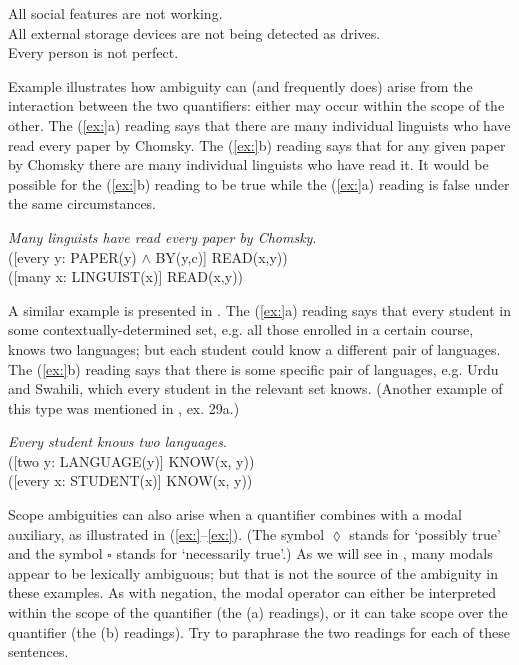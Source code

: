 \ea
\ea All social features are not working.\\
\ex All external storage devices are not being detected as drives.\\
\ex Every person is not perfect.
                       \z
\z


Example  illustrates how ambiguity can (and frequently does) arise from the interaction between the two quantifiers: either may occur within the scope of the other. The (\ref{ex:}a) reading says that there are many individual linguists who have read every paper by Chomsky. The (\ref{ex:}b) reading says that for any given paper by Chomsky there are many individual linguists who have read it. It would be possible for the (\ref{ex:}b) reading to be true while the (\ref{ex:}a) reading is false under the same circumstances.


\ea
\textit{Many linguists have read every paper by Chomsky}.\\
 ([every y: PAPER(y) $\wedge$ BY(y,c)] READ(x,y))\\
 ([many x: LINGUIST(x)] READ(x,y))
                       \z
\z


A similar example is presented in . The (\ref{ex:}a) reading says that every student in some contextually-determined set, e.g. all those enrolled in a certain course, knows two languages; but each student could know a different pair of languages. The (\ref{ex:}b) reading says that there is some specific pair of languages, e.g. Urdu and Swahili, which every student in the relevant set knows. (Another example of this type was mentioned in , ex. 29a.)


\ea
\textit{Every student knows two languages}.\\
 ([two y: LANGUAGE(y)] KNOW(x, y))\\
 ([every x: STUDENT(x)] KNOW(x, y))
                       \z
\z


Scope ambiguities can also arise when a quantifier combines with a modal auxiliary, as illustrated in (\ref{ex:}--\ref{ex:}). (The symbol ${\lozenge}$ stands for ‘possibly true’ and the symbol ${\square}$ stands for ‘necessarily true’.) As we will see in , many modals appear to be lexically ambiguous; but that is not the source of the ambiguity in these examples. As with negation, the modal operator can either be interpreted within the scope of the quantifier (the (a) readings), or it can take scope over the quantifier (the (b) readings). Try to paraphrase the two readings for each of these sentences.


